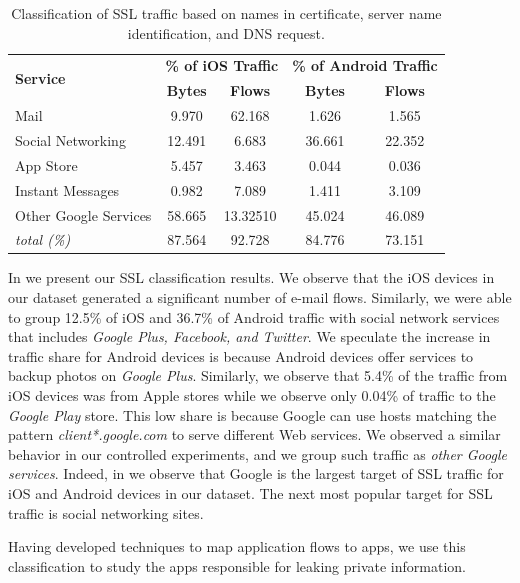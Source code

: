 \begin{table}
\centering
\begin{small}
\begin{tabular}{|p{}|c|c|c|c|}
\hline
\multirow{2}{*}{\bf Service} & \multicolumn{2}{c|}{\bf \% of iOS Traffic} &  \multicolumn{2}{c|}{\bf \% of Android Traffic} \tabularnewline
\cline{2-5}
  & {\bf Bytes}  & {\bf Flows} & {\bf Bytes} & {\bf Flows} \tabularnewline
\hline
Mail                 & 9.970    & 62.168   & 1.626  & 1.565 \tabularnewline
\hline
Social Networking    & 12.491   & 6.683    & 36.661 & 22.352 \tabularnewline
\hline
App Store   & 5.457    & 3.463    & 0.044  & 0.036 \tabularnewline
\hline
Instant Messages     & 0.982    & 7.089    & 1.411  & 3.109 \tabularnewline
\hline
Other Google Services & 58.665   & 13.32510 & 45.024 & 46.089 \tabularnewline
\hline
\emph{total (\%)}         & 87.564   & 92.728   & 84.776 & 73.151 \tabularnewline
\hline
\end{tabular} 
\end{small}
\caption{Classification of \mobWild SSL traffic based on names in certificate, server name identification, and DNS request.}
\label{tab:classify-ssl-traffic}
\end{table}

In  we present our SSL classification results.
We observe that the iOS devices in our dataset generated a significant number of e-mail flows.
Similarly, we were able to group 12.5\% of iOS and 36.7\% of Android traffic with social network services that includes \emph{Google Plus, Facebook, and Twitter}.
We speculate the increase in traffic share for Android devices is because Android devices offer services to backup photos on \emph{Google Plus}.
Similarly, we observe that 5.4\% of the traffic from iOS devices was from Apple stores while we observe only 0.04\% of traffic to the \emph{Google Play} store. 
This low share is because Google can use hosts matching the pattern \emph{client*.google.com} to serve different Web services.
We observed a similar behavior in our controlled experiments, and we group such traffic as \emph{other Google services}.
Indeed, in  we observe that Google is the largest target of SSL traffic for iOS and Android devices in our dataset. 
The next most popular target for SSL traffic is social networking sites.

Having developed techniques to map application flows to apps, we use this classification to study the apps responsible for 
leaking private information.

